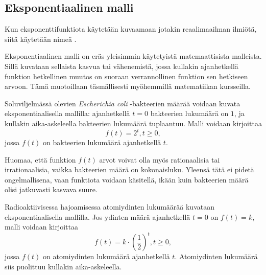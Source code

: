 \subsection*{Eksponentiaalinen malli}

Kun eksponenttifunktiota käytetään kuvaamaan jotakin reaalimaailman
ilmiötä, siitä käytetään nimeä .

Eksponentiaalinen malli on eräs yleisimmin käytetyistä matemaattisista
malleista. Sillä kuvataan sellaista kasvua tai vähenemistä, jossa
kullakin ajanhetkellä funktion hetkellinen muutos on suoraan
verrannollinen funktion sen hetkiseen arvoon. Tämä muotoillaan
täsmällisesti myöhemmillä matematiikan kursseilla.

\begin{esimerkki}
Soluviljelmässä olevien \textit{Escherichia coli} -bakteerien
määrää voidaan kuvata eksponentiaalisella mallilla: ajanhetkellä
$t = 0$ bakteerien lukumäärä on $1$, ja kullakin aika-askeleella
bakteerien lukumäärä tuplaantuu. Malli voidaan kirjoittaa
\[
f(t) = 2^t, t \ge 0,
\]
jossa $f(t)$ on bakteerien lukumäärä ajanhetkellä $t$.

Huomaa, että funktion $f(t)$ arvot voivat
olla myös rationaalisia tai irrationaalisia, vaikka bakteerien
määrä on kokonaisluku. Yleensä tätä ei pidetä ongelmallisena,
vaan funktiota voidaan käsitellä, ikään kuin bakteerien määrä
olisi jatkuvasti kasvava suure.

\begin{center}
	\begin{kuvaajapohja}{0.8}{-4}{6}{-1}{9}
	\end{kuvaajapohja}
\end{center}

\end{esimerkki}

\begin{esimerkki}
Radioaktiivisessa hajoamisessa atomiydinten lukumäärää kuvataan
eksponentiaalisella mallilla. Jos ydinten määrä ajanhetkellä
$t = 0$ on $f(t) = k$, malli voidaan kirjoittaa
\[
f(t) = k \cdot \left( \frac{1}{2} \right)^t, t \ge 0,
\]
jossa $f(t)$ on atomiydinten lukumäärä ajanhetkellä $t$. Atomiydinten
lukumäärä siis puolittuu kullakin aika-askeleella.
\end{esimerkki}

